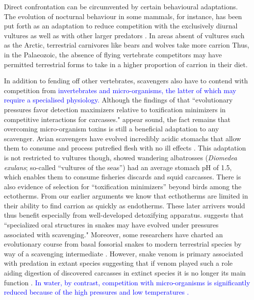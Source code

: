 \documentclass[a4paper,12pt]{article}
\begin{document}
Direct confrontation can be circumvented by certain behavioural adaptations. 
The evolution of nocturnal behaviour in some mammals, for instance, has been put forth as an adaptation to reduce competition with the exclusively diurnal vultures as well as with other larger predators \citep{gittleman2013carnivore,moleon2014inter,pereira2014facultative}. 
In areas absent of vultures such as the Arctic, terrestrial carnivores like bears and wolves take more carrion \citep{devault2003scavenging}
Thus, in the Palaeozoic, the absence of flying vertebrate competitors may have permitted terrestrial forms to take in a higher proportion of carrion in their diet.

In addition to fending off other vertebrates, scavengers also have to contend with competition from \textcolor{blue}{invertebrates and micro-organisms, the latter of which may require a specialised physiology.} 
Although the findings of \cite{shivik2006vultures} that ``evolutionary pressures favor detection maximizers relative to toxification minimizers in competitive interactions for carcasses." appear sound, the fact remains that overcoming micro-organism toxins is still a beneficial adaptation to any scavenger. 
Avian scavengers have evolved incredibly acidic stomachs that allow them to consume and process putrefied flesh with no ill effects \citep{houston1975digestive,roggenbuck2014microbiome}. 
This adaptation is not restricted to vultures though, \cite{gremillet2012vultures} showed wandering albatrosses (\textit{Diomedea exulans}; so-called ``vultures of the seas'') had an average stomach pH of 1.5, which enables them to consume fisheries discards and squid carcasses. 
There is also evidence of selection for ``toxification minimizers'' beyond birds among the ectotherms.
From our earlier arguments we know that ecthotherms are limited in their ability to find carrion as quickly as endotherms. 
These later arrivers would thus benefit especially from well-developed detoxifying apparatus. 
\cite{shivik2006vultures} suggests that ``specialized oral structures in snakes may have evolved under pressures associated with scavenging."
Moreover, some researchers have charted an evolutionary course from basal fossorial snakes to modern terrestrial species by way of a scavenging intermediate \citep{bauchot2006snakes}. However, snake venom is primary associated with predation in extant species suggesting that if venom played such a role aiding digestion of discovered carcasses in extinct species it is no longer its main function \citep{casewell2013complex}.
\textcolor{blue}{In water, by contrast, competition with micro-organisms is significantly reduced because of the high pressures and low temperatures \citep{beasley2012carrion}.}
\end{document}
